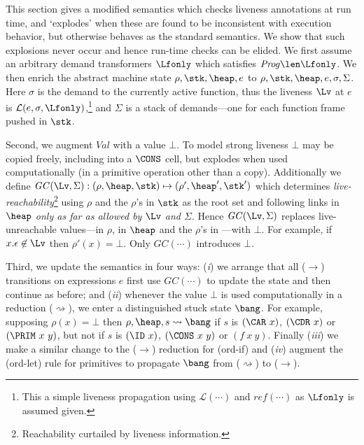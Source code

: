 This section gives a modified semantics
which checks liveness annotations
at run time, and `explodes' when these are found to be inconsistent with execution behavior,
but otherwise behaves as the standard semantics.
We show that such explosions never occur and hence run-time checks
can be elided.
We first assume an arbitrary  demand transformers $\Lfonly$ which satisfies
$\mathit{Prog} \len \Lfonly$.
We then enrich the abstract machine state $\rho, \stk, \heap, e$ to
$\rho, \stk, \heap, e, \sigma, \Sigma$.
Here $\sigma$ is the demand to the currently active function,
thus the liveness $\Lv$ at $e$ is $\mathcal{L}(e,\sigma,\Lfonly)$,\footnote{
This a simple liveness propagation using $\mathcal{L}(\cdots)$
and $\mathit{ref}(\cdots)$ as $\Lfonly$ is assumed given.}
and $\Sigma$ is a stack of demands---one for each function frame
pushed in $\stk$.

Second, we augment $\mathit{Val}$ with a value $\bot$.
To model strong liveness $\bot$ may be copied freely,
including into a $\CONS$ cell,
but explodes
when used computationally (in a primitive operation other than a copy).
Additionally we define
$\mathit{GC}(\Lv,\Sigma): (\rho, \heap, \stk) \mapsto (\rho', \heap', \stk')$
which determines {\em live-reachability}\footnote{Reachability curtailed by liveness information.}
using $\rho$ and the $\rho$'s in $\stk$ as the root set
and following links in $\heap$ {\em only as far as allowed by $\Lv$ and $\Sigma$}.
Hence $\mathit{GC}(\Lv,\Sigma)$ replaces
live-unreachable values---in $\rho$, in $\heap$ and the $\rho$'s in \stk---with $\bot$.
For example, if $x.\epsilon \not\in \Lv$ then $\rho'(x) = \bot$.
Only $\mathit{GC}(\cdots)$ introduces $\bot$.

Third, we update the semantics in four ways: ({\em i\/}) we arrange that all
($\rightarrow$) transitions on expressions $e$ first use $\mathit{GC}(\cdots)$
to update the state and then continue as before;
and ({\em ii\/}) whenever the value $\bot$ is used computationally in a reduction
($\rightsquigarrow$), we enter a distinguished stuck state $\bang$.
For example, supposing $\rho(x)=\bot$
then
$\rho, \heap, s \rightsquigarrow \bang$ if $s$ is
$(\CAR\,\, x)$, $(\CDR\,\, x)$ or $(\PRIM\,\, x\ y)$,
but not if $s$ is $(\ID~x)$, $(\CONS~x~y)$ or $(f~x~y)$.
Finally ({\em iii\/}) we make a similar change to the ($\rightarrow$) reduction for ({\sc ord-if})
and ({\em iv\/}) augment the ({\sc ord-let}) rule for primitives to propagate
$\bang$ from ($\rightsquigarrow$) to ($\rightarrow$).




